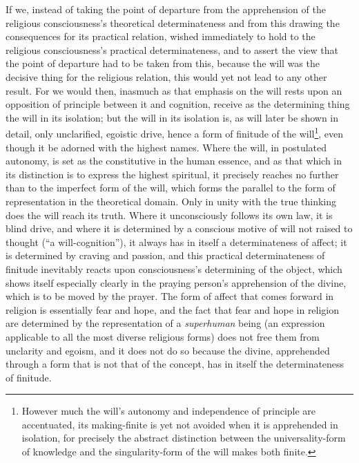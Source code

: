 \documentclass[12pt,a4paper]{book}
\begin{document}
If we, instead of taking the point of departure from the apprehension of the
religious consciousness's theoretical determinateness and from this drawing the
consequences for its practical relation, wished immediately to hold to the
religious consciousness's practical determinateness, and to assert the view that
the point of departure had to be taken from this, because the will was the
decisive thing for the religious relation, this would yet not lead to any other
result. For we would then, inasmuch as that emphasis on the will rests upon an
opposition of principle between it and cognition, receive as the determining
thing the will in its isolation; but the will in its isolation is, as will later
be shown in detail, only unclarified, egoistic drive, hence a form of finitude
of the will\footnote{However much the will's autonomy and independence of
principle are accentuated, its making-finite is yet not avoided when it is
apprehended in isolation, for precisely the abstract distinction between the
universality-form of knowledge and the singularity-form of the will makes both
finite.}, even though it be adorned with the highest names. Where the will, in
postulated autonomy, is set as the constitutive in the human essence, and as that
which in its distinction is to express the highest spiritual, it precisely reaches
no further than to the imperfect form of the will, which forms the parallel to the
form of representation in the theoretical domain. Only in unity with the true
thinking does the will reach its truth. Where it unconsciously follows its own
law, it is blind drive, and where it is determined by a conscious motive of will
not raised to thought (``a will-cognition''), it always has in itself a
determinateness of affect; it is determined by craving and passion, and this
practical determinateness of finitude inevitably reacts upon consciousness's
determining of the object, which shows itself especially clearly in the praying
person's apprehension of the divine, which is to be moved by the prayer. The form
of affect that comes forward in religion is essentially fear and hope, and the
fact that fear and hope in religion are determined by the representation of a
\emph{superhuman} being (an expression applicable to all the most diverse
religious forms) does not free them from unclarity and egoism, and it does not do
so because the divine, apprehended through a form that is not that of the concept,
has in itself the determinateness of finitude.
\end{document}
